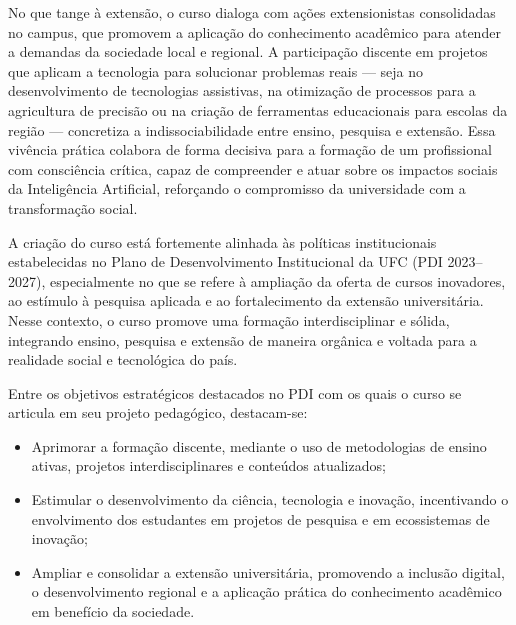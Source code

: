 No que tange à extensão, o curso dialoga com ações extensionistas consolidadas no campus, que promovem a aplicação do conhecimento acadêmico para atender a demandas da sociedade local e regional. A participação discente em projetos que aplicam a tecnologia para solucionar problemas reais — seja no desenvolvimento de tecnologias assistivas, na otimização de processos para a agricultura de precisão ou na criação de ferramentas educacionais para escolas da região — concretiza a indissociabilidade entre ensino, pesquisa e extensão. Essa vivência prática colabora de forma decisiva para a formação de um profissional com consciência crítica, capaz de compreender e atuar sobre os impactos sociais da Inteligência Artificial, reforçando o compromisso da universidade com a transformação social.

A criação do curso está fortemente alinhada às políticas institucionais estabelecidas no Plano de Desenvolvimento Institucional da UFC (PDI 2023–2027), especialmente no que se refere à ampliação da oferta de cursos inovadores, ao estímulo à pesquisa aplicada e ao fortalecimento da extensão universitária. Nesse contexto, o curso promove uma formação interdisciplinar e sólida, integrando ensino, pesquisa e extensão de maneira orgânica e voltada para a realidade social e tecnológica do país.

Entre os objetivos estratégicos destacados no PDI com os quais o curso se articula em seu projeto pedagógico, destacam-se:
\begin{itemize}
    \item {Aprimorar a formação discente}, mediante o uso de metodologias de ensino ativas, projetos interdisciplinares e conteúdos atualizados;

    \item {Estimular o desenvolvimento da ciência, tecnologia e inovação}, incentivando o envolvimento dos estudantes em projetos de pesquisa e em ecossistemas de inovação;

    \item {Ampliar e consolidar a extensão universitária}, promovendo a inclusão digital, o desenvolvimento regional e a aplicação prática do conhecimento acadêmico em benefício da sociedade.
    
\end{itemize}

